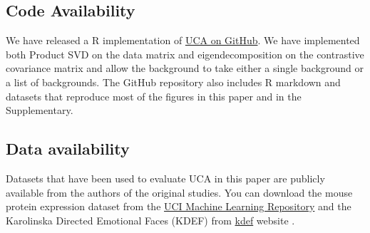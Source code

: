 \documentclass[12pt]{article}
\begin{document}
\subsection{Code Availability}
We have released a R implementation of \href{https://github.com/rtud2/Residual-Dimension-Reduction/tree/master/uca}{UCA on GitHub}. We have implemented both Product SVD on the data matrix and eigendecomposition on the contrastive covariance matrix and allow the background to take either a single background or a list of backgrounds. The GitHub repository also includes R markdown and datasets that reproduce most of the figures in this paper and in the Supplementary.

\subsection{Data availability}
Datasets that have been used to evaluate UCA in this paper are publicly available from the authors of the original studies. You can download the mouse protein expression dataset from the \href{https://archive.ics.uci.edu/ml/datasets/Mice+Protein+Expression}{UCI Machine Learning Repository} \cite{Higuera} and the Karolinska Directed Emotional Faces (KDEF) from \href{https://kdef.se/}{kdef} website  \cite{Calvo2008}.







\end{document}
